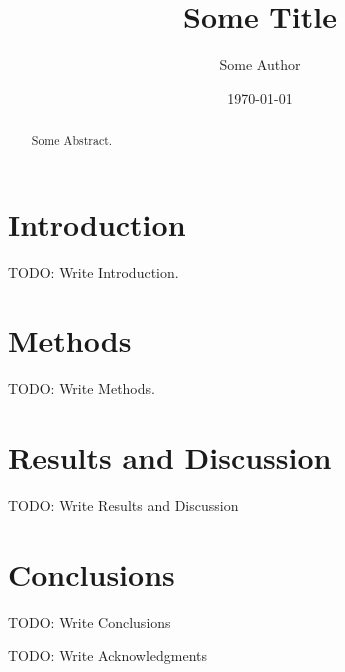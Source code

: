 \documentclass[aps, prl, twocolumn]{revtex4-1}
\begin{document}
\title{Some Title}

\author{Some Author}

\date{\today}

\begin{abstract}
Some Abstract.
\end{abstract}

\maketitle

\section{Introduction}

TODO: Write Introduction.

\section{Methods}

TODO: Write Methods.

\section{Results and Discussion}

TODO: Write Results and Discussion

\section{Conclusions}

TODO: Write Conclusions

\begin{acknowledgments}
TODO: Write Acknowledgments
\end{acknowledgments}
\end{document}
